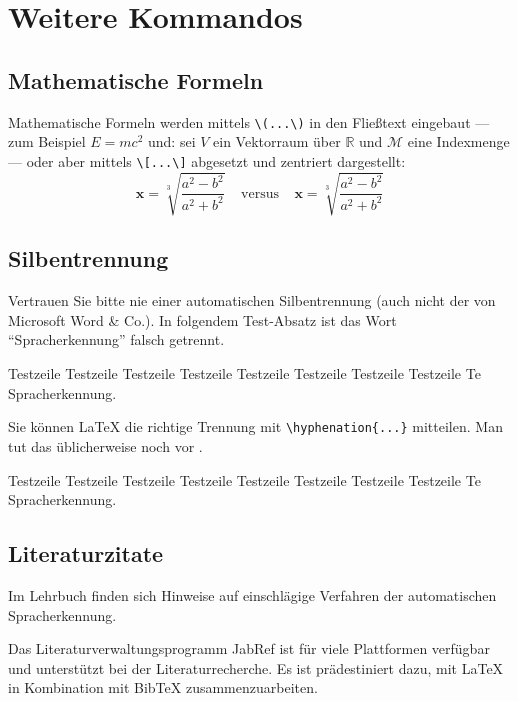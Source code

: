 %
%

\section{Weitere Kommandos}

\subsection{Mathematische Formeln}

Mathematische Formeln werden mittels \verb|\(...\)|
in den Fließtext eingebaut
--- zum Beispiel \( E=mc^2 \) und:
sei \(V\) ein Vektorraum über \(\mathbb{R}\)
und \(\mathcal{M}\) eine Indexmenge
---
oder aber mittels \verb|\[...\]|
abgesetzt und zentriert dargestellt:
	\[
	\pmb{x} = \sqrt[3]{\frac{a^2-b^2}{a^2+b^2}}
		~~~~~ \text{versus} ~~~~~
	\boldsymbol{x} = \sqrt[3]{\frac{a^2-b^2}{a^2+b^2}}
	\]


\subsection{Silbentrennung}
Vertrauen Sie bitte nie einer automatischen Silbentrennung (auch nicht der von Microsoft Word \& Co.). In folgendem Test-Absatz ist das Wort "`Spracherkennung"' falsch getrennt.

Testzeile Testzeile Testzeile Testzeile Testzeile Testzeile Testzeile Testzeile Te Spracherkennung.

Sie können LaTeX die richtige Trennung mit \verb|\hyphenation{...}| mitteilen. Man tut das üblicherweise noch vor \verb||.

Testzeile Testzeile Testzeile Testzeile Testzeile Testzeile Testzeile Testzeile Te Spracherkennung.


\subsection{Literaturzitate}
\label{sec:literaturzitate}

Im Lehrbuch \cite{Schukat-Talamazzini1995}
finden sich Hinweise auf einschlägige Verfahren der automatischen Spracherkennung.

Das Literaturverwaltungsprogramm JabRef \cite{Kopp2018} ist für viele Plattformen verfügbar und unterstützt bei der Literaturrecherche. Es ist prädestiniert dazu, mit {\LaTeX} in Kombination mit {Bib\TeX} zusammenzuarbeiten.

